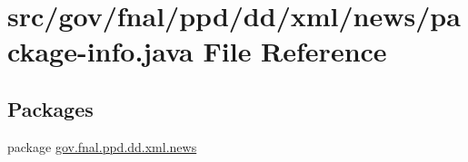 \hypertarget{dd_2xml_2news_2package-info_8java}{\section{src/gov/fnal/ppd/dd/xml/news/package-\/info.java File Reference}
\label{dd_2xml_2news_2package-info_8java}
}
\subsection*{Packages}
\begin{DoxyCompactItemize}
\item 
package \hyperlink{namespacegov_1_1fnal_1_1ppd_1_1dd_1_1xml_1_1news}{gov.\-fnal.\-ppd.\-dd.\-xml.\-news}
\end{DoxyCompactItemize}
